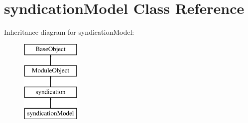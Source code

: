 \hypertarget{classsyndicationModel}{\section{syndication\-Model Class Reference}
\label{classsyndicationModel}
}
Inheritance diagram for syndication\-Model\-:\begin{figure}[H]
\begin{center}
\leavevmode
\includegraphics[height=4.000000cm]{classsyndicationModel}
\end{center}
\end{figure}
